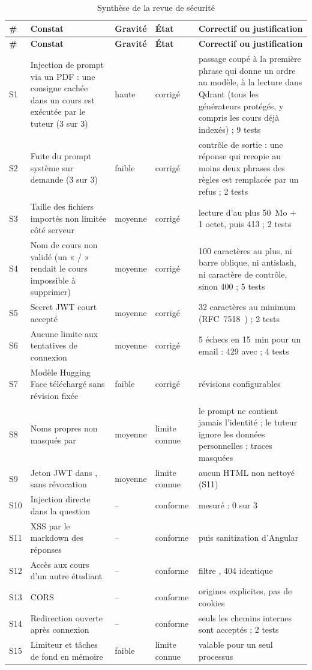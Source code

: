 \documentclass[12pt,a4paper]{report}
\DeclareRobustCommand{\code}[1]{\texttt{\codecasse{#1}}}
\begin{document}
\begin{longtable}{@{}P{0.7cm}P{4.8cm}P{1.6cm}P{1.8cm}P{5.0cm}@{}}
\caption{Synthèse de la revue de sécurité}
\label{tab:securite}\\
\toprule
\textbf{\#} & \textbf{Constat} & \textbf{Gravité} & \textbf{État} & \textbf{Correctif ou justification} \\
\midrule
\endfirsthead
\toprule
\textbf{\#} & \textbf{Constat} & \textbf{Gravité} & \textbf{État} & \textbf{Correctif ou justification} \\
\midrule
\endhead
S1 & Injection de prompt via un PDF : une consigne cachée dans un cours est exécutée par le tuteur (3 sur 3) & haute & corrigé & passage coupé à la première phrase qui donne un ordre au modèle, à la lecture dans Qdrant (tous les générateurs protégés, y compris les cours déjà indexés) ; 9 tests \\
S2 & Fuite du prompt système sur demande (3 sur 3) & faible & corrigé & contrôle de sortie : une réponse qui recopie au moins deux phrases des règles est remplacée par un refus ; 2 tests \\
S3 & Taille des fichiers importés non limitée côté serveur & moyenne & corrigé & lecture d'au plus 50~Mo + 1 octet, puis 413 ; 2 tests \\
S4 & Nom de cours non validé (un « / » rendait le cours impossible à supprimer) & moyenne & corrigé & 100 caractères au plus, ni barre oblique, ni antislash, ni caractère de contrôle, sinon 400 ; 5 tests \\
S5 & Secret JWT court accepté & moyenne & corrigé & 32 caractères au minimum (RFC~7518~\cite{rfc7518}) ; 2 tests \\
S6 & Aucune limite aux tentatives de connexion & moyenne & corrigé & 5 échecs en 15~min pour un email : 429 avec \code{Retry-After} ; 4 tests \\
S7 & Modèle Hugging Face téléchargé sans révision fixée & faible & corrigé & révisions configurables \\
S8 & Noms propres non masqués par \code{mask_pii} & moyenne & limite connue & le prompt ne contient jamais l'identité ; le tuteur ignore les données personnelles ; traces masquées \\
S9 & Jeton JWT dans \code{localStorage}, sans révocation & moyenne & limite connue & aucun HTML non nettoyé (S11) \\
S10 & Injection directe dans la question & -- & conforme & mesuré : 0 sur 3 \\
S11 & XSS par le markdown des réponses & -- & conforme & \code{marked} puis sanitization d'Angular \\
S12 & Accès aux cours d'un autre étudiant & -- & conforme & filtre \code{user_id}, 404 identique \\
S13 & CORS & -- & conforme & origines explicites, pas de cookies \\
S14 & Redirection ouverte après connexion & -- & conforme & seuls les chemins internes sont acceptés ; 2 tests \\
S15 & Limiteur et tâches de fond en mémoire & faible & limite connue & valable pour un seul processus \\
\bottomrule
\end{longtable}
\end{document}
